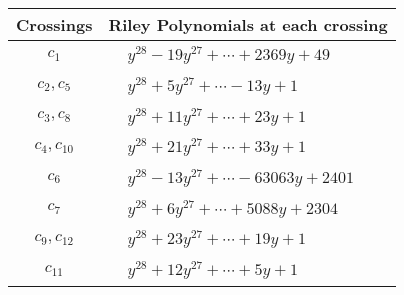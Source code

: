 \documentclass[1p]{elsarticle_modified}
\theoremstyle{definition}
\begin{document}
\begin{tabular}{m{50pt}|m{274pt}}
Crossings & \hspace{64pt}Riley Polynomials at each crossing \\
\hline $$\begin{aligned}c_{1}\end{aligned}$$&$\begin{aligned}
&y^{28}-19 y^{27}+\cdots+2369 y+49
\end{aligned}$\\
\hline $$\begin{aligned}c_{2},c_{5}\end{aligned}$$&$\begin{aligned}
&y^{28}+5 y^{27}+\cdots-13 y+1
\end{aligned}$\\
\hline $$\begin{aligned}c_{3},c_{8}\end{aligned}$$&$\begin{aligned}
&y^{28}+11 y^{27}+\cdots+23 y+1
\end{aligned}$\\
\hline $$\begin{aligned}c_{4},c_{10}\end{aligned}$$&$\begin{aligned}
&y^{28}+21 y^{27}+\cdots+33 y+1
\end{aligned}$\\
\hline $$\begin{aligned}c_{6}\end{aligned}$$&$\begin{aligned}
&y^{28}-13 y^{27}+\cdots-63063 y+2401
\end{aligned}$\\
\hline $$\begin{aligned}c_{7}\end{aligned}$$&$\begin{aligned}
&y^{28}+6 y^{27}+\cdots+5088 y+2304
\end{aligned}$\\
\hline $$\begin{aligned}c_{9},c_{12}\end{aligned}$$&$\begin{aligned}
&y^{28}+23 y^{27}+\cdots+19 y+1
\end{aligned}$\\
\hline $$\begin{aligned}c_{11}\end{aligned}$$&$\begin{aligned}
&y^{28}+12 y^{27}+\cdots+5 y+1
\end{aligned}$\\
\hline
\end{tabular}\\~\\
\end{document}
